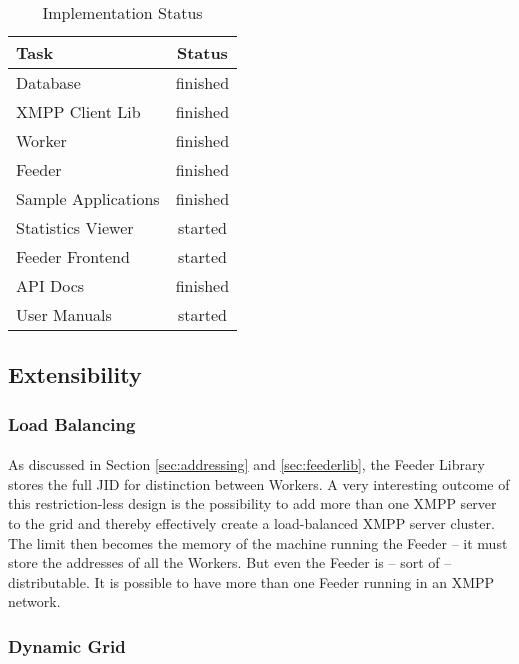 \begin{table}[H]
\begin{tabularx}{\linewidth}{lc}
\toprule
\textbf{Task} & \textbf{Status} \\
\midrule
\endhead
Database            & finished \\
XMPP Client Lib     & finished \\
Worker              & finished \\
Feeder              & finished \\
Sample Applications & finished \\
Statistics Viewer   & started  \\
Feeder Frontend     & started  \\
API Docs            & finished \\
User Manuals        & started  \\
\bottomrule
\end{tabularx}
\caption{Implementation Status}
\label{tab:impstatus}
\end{table}


\subsection{Extensibility}
\label{sec:extensibility}

\subsubsection{Load Balancing}
\paragraph{}
As discussed in Section \ref{sec:addressing} and \ref{sec:feederlib}, the Feeder Library stores the full JID for distinction between Workers. A very interesting outcome of this restriction-less design is the possibility to add more than one XMPP server to the grid and thereby effectively create a load-balanced XMPP server cluster. The limit then becomes the memory of the machine running the Feeder -- it must store the addresses of all the Workers. But even the Feeder is -- sort of -- distributable. It is possible to have more than one Feeder running in an XMPP network.

\subsubsection{Dynamic Grid}
